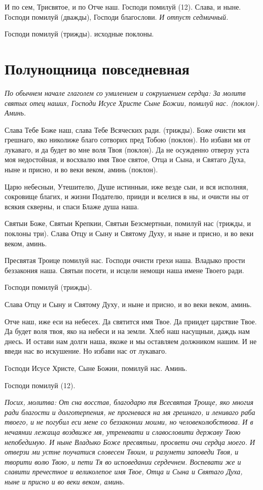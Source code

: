 И по сем, Трисвятое, и по Отче наш. Господи помилуй (12). Слава, и ныне. Господи помилуй (дважды), Господи благослови. \itshape И отпуст седмичный.\normalfont{}

Господи помилуй (трижды). исходные поклоны.


\section{Полунощница повседневная}
 


\itshape По обычнем начале глаголем со умилением и сокрушением сердца:\normalfont{} За молитв святых отец наших, Господи Исусе Христе Сыне Божии, помилуй нас. (поклон). Аминь. 


Слава Тебе Боже наш, слава Тебе Всяческих ради. (трижды). Боже очисти мя грешнаго, яко николиже благо сотворих пред Тобою (поклон). Но избави мя от лукаваго, и да будет во мне воля Твоя (поклон). Да не осужденно отверзу уста моя недостойная, и восхвалю имя Твое святое, Отца и Сына, и Святаго Духа, ныне и присно, и во веки веком, аминь (поклон). 

Царю небесныи, Утешителю, Душе истинныи, иже везде сыи, и вся исполняя, сокровище благих, и жизни Подателю, прииди и вселися в ны, и очисти ны от всякия скверны, и спаси Блаже душа наша. 

Святыи Боже, Святыи Крепкии, Святыи Безсмертныи, помилуй нас (трижды, и поклоны три). Слава Отцу и Сыну и Святому Духу, и ныне и присно, и во веки веком, аминь. 

Пресвятая Троице помилуй нас. Господи очисти грехи наша. Владыко прости беззакония наша. Святыи посети, и исцели немощи наша имене Твоего ради. 

Господи помилуй (трижды). 

Слава Отцу и Сыну и Святому Духу, и ныне и присно, и во веки веком, аминь. 

Отче наш, иже еси на небесех. Да святится имя Твое. Да приидет царствие Твое. Да будет воля твоя, яко на небеси и на земли. Хлеб наш насущныи, даждь нам днесь. И остави нам долги наша, якоже и мы оставляем должником нашим. И не введи нас во искушение. Но избави нас от лукаваго. 

Господи Исусе Христе, Сыне Божии, помилуй нас. Аминь. 

Господи помилуй (12). 

\itshape Посих, молитва:\normalfont{} От сна восстав, благодарю тя Всесвятая Троице, яко многия ради благости и долготерпения, не прогневася на мя грешнаго, и лениваго раба твоего, и не погубил еси мене со беззаконии моими, но человеколюбствова. И в нечаянии лежаща воздвиже мя, утреневати и славословити державу Твою непобедимую. И ныне Владыко Боже пресвятыи, просвети очи сердца моего. И отверзи ми устне поучатися словесем Твоим, и разумети заповеди Твоя, и творити волю Твою, и пети Тя во исповедании сердечнем. Воспевати же и славити пречестное и великолепое имя Твое, Отца и Сына и Святаго Духа, ныне и присно и во веки веком, аминь. 

